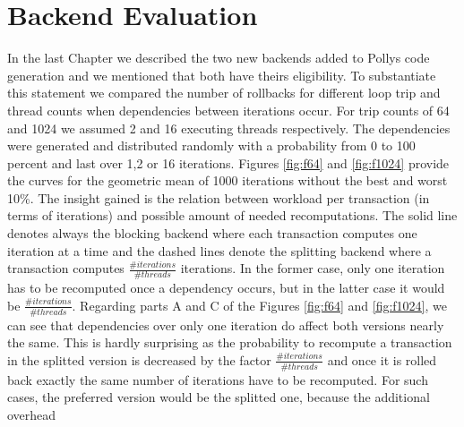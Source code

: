 \section{Backend Evaluation}
\label{Rollbacks}
In the last Chapter we described the two new backends added
to Pollys code generation and we mentioned that both have theirs eligibility.
To substantiate this statement we compared the number of rollbacks for different
loop trip and thread counts when dependencies between iterations occur.
For trip counts of 64 and 1024 we assumed 2 and 16 executing threads respectively.
The dependencies were generated and distributed randomly
with a probability from 0 to 100 percent and last over 1,2 or 16 iterations.
Figures \ref{fig:f64} and \ref{fig:f1024} provide the curves for the geometric mean 
of 1000 iterations without the best and worst 10\%.
The insight gained is the relation between workload per transaction 
(in terms of iterations) and possible amount of needed recomputations. 
The solid line denotes always the blocking backend where each transaction
computes one iteration at a time and the dashed lines denote the splitting backend 
where a transaction computes $\frac{\#iterations}{\#threads}$ iterations. 
In the former case, only one iteration has to be recomputed once a dependency occurs, 
but in the latter case it would be $\frac{\#iterations}{\#threads}$.  Regarding parts 
{\footnotesize A} and {\footnotesize C} of the Figures 
\ref{fig:f64} and \ref{fig:f1024}, we can see that dependencies over only one 
iteration do affect both versions nearly the same. This is hardly 
surprising as the probability to recompute a transaction in the splitted version
is decreased by the factor $\frac{\#iterations}{\#threads}$ and once it is rolled
back exactly the same number of iterations have to be recomputed. For such cases,
the preferred version would be the splitted one, because the additional overhead
